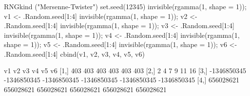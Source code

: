 \begin{Schunk}
\begin{Sinput}
 RNGkind ("Mersenne-Twister")
 set.seed(12345)
 invisible(rgamma(1, shape = 1)); v1 <- .Random.seed[1:4]
 invisible(rgamma(1, shape = 1)); v2 <- .Random.seed[1:4]
 invisible(rgamma(1, shape = 1)); v3 <- .Random.seed[1:4]
 invisible(rgamma(1, shape = 1)); v4 <- .Random.seed[1:4]
 invisible(rgamma(1, shape = 1)); v5 <- .Random.seed[1:4]
 invisible(rgamma(1, shape = 1)); v6 <- .Random.seed[1:4]
 cbind(v1, v2, v3, v4, v5, v6)
\end{Sinput}
\begin{Soutput}
              v1          v2          v3          v4          v5          v6
[1,]         403         403         403         403         403         403
[2,]           2           4           7           9          11          16
[3,] -1346850345 -1346850345 -1346850345 -1346850345 -1346850345 -1346850345
[4,]   656028621   656028621   656028621   656028621   656028621   656028621
\end{Soutput}
\end{Schunk}
